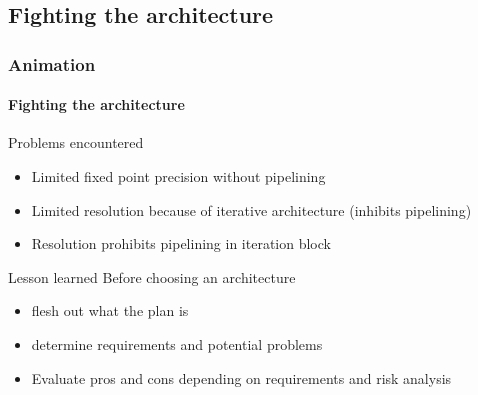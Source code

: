 \documentclass{beamer}
\begin{document}
\subsection{Fighting the architecture}
\begin{frame}
    \frametitle{Animation}
    \framesubtitle{Fighting the architecture}
    \begin{block}{Problems encountered}
        \begin{itemize}
            \item Limited fixed point precision without pipelining
            \item Limited resolution because of iterative architecture (inhibits pipelining)
            \item Resolution prohibits pipelining in iteration block
        \end{itemize}
    \end{block}

    \begin{exampleblock}{Lesson learned}
        Before choosing an architecture
        \begin{itemize}
            \item flesh out what the plan is
            \item determine requirements and potential problems
            \item Evaluate pros and cons depending on requirements and risk analysis
        \end{itemize}
    \end{exampleblock}

\end{frame}
\end{document}
